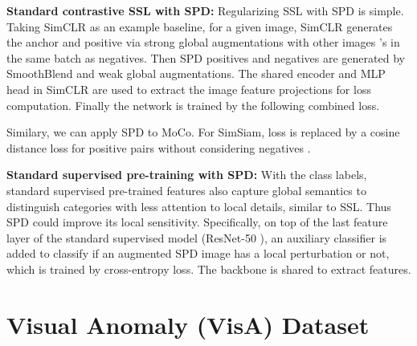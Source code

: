 \documentclass[runningheads]{llncs}
\begin{document}
\noindent\textbf{Standard contrastive SSL with SPD:} Regularizing SSL with SPD is simple. Taking SimCLR as an example baseline, for a given image, SimCLR generates the anchor  and positive  via strong global augmentations with other images 's in the same batch as negatives. Then SPD positives  and negatives  are generated by SmoothBlend and weak global augmentations. The shared encoder and MLP head in SimCLR are used to extract the image feature projections for loss computation. Finally the network is trained by the following combined loss.

Similary, we can apply SPD to MoCo. For SimSiam,  loss is replaced by a cosine distance loss for positive pairs without considering negatives \cite{chen2021exploring}.

\noindent\textbf{Standard supervised pre-training with SPD:} With the class labels, standard supervised pre-trained features also capture global semantics to distinguish categories with less attention to local details, similar to SSL. Thus SPD could improve its local sensitivity. Specifically, on top of the last feature layer of the standard supervised model (ResNet-50 \cite{he2016deep}), an auxiliary classifier is added to classify if an augmented SPD image has a local perturbation or not, which is trained by cross-entropy loss. The backbone is shared to extract features.
\section{Visual Anomaly (VisA) Dataset}
\end{document}
